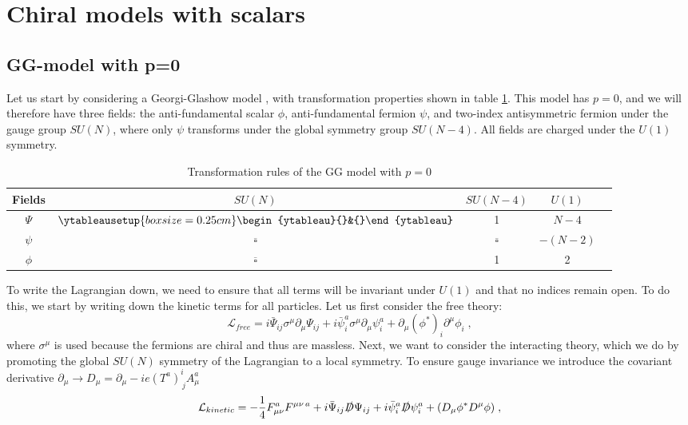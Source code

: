 \section{Chiral models with scalars}
\subsection{GG-model with p=0}
Let us start by considering a Georgi-Glashow model \cite{GGmodel}, with transformation properties shown in table \ref{tab:GGp0}. This model has $p=0$, and we will therefore have three fields: the anti-fundamental scalar $\phi$, anti-fundamental fermion $\psi$, and two-index antisymmetric fermion under the gauge group $SU(N)$, where only $\psi$ transforms under the global symmetry group $SU(N-4)$. All fields are charged under the $U(1)$ symmetry.  
\begin{table}[h] 
    \centering 
    \begin{tabular}{|c|c|c|c|c|} \hline Fields & $SU(N)$ & $SU(N-4)$  & $U(1)$ \\ \hline $\Psi$ & $\ytableausetup{boxsize=0.25cm}\begin{ytableau}{}&{}\end{ytableau}$ & 1 & $N-4$ \\ $\psi$ & $\overline\square$ & $\overline\square$ & $-(N-2)$ \\ \hline $\phi$ & $\overline\square$ & 1  & 2 \\ \hline 
    \end{tabular} 
    \caption{Transformation rules of the GG model with $p=0$} 
    \label{tab:GGp0} 
\end{table}
To write the Lagrangian down, we need to ensure that all terms will be invariant under $U(1)$ and that no indices remain open. To do this, we start by writing down the kinetic terms for all particles. Let us first consider the free theory:
\begin{equation}
    \mathcal{L}_{free}= i \bar \Psi_{ij}\sigma^\mu \partial_\mu\Psi_{ij}+i \bar \psi_i^a\sigma^\mu \partial_\mu\psi_i^a+\partial_\mu (\phi^*)_i\partial^\mu\phi_i\;,
\end{equation}
where $\sigma^\mu$ is used because the fermions are chiral and thus are massless. Next, we want to consider the interacting theory, which we do by promoting the global $SU(N)$ symmetry of the Lagrangian to a local symmetry. To ensure gauge invariance we introduce the covariant derivative $\partial_\mu \to D_\mu= \partial_\mu - ie(T^a)^i_{\,j}A_\mu^a$
\begin{equation}
    \mathcal{L}_{kinetic}= -\frac{1}{4} F_{\mu\nu}^a F^{\mu\nu\,a}+i \bar \Psi_{ij}\slashed{D}\Psi_{ij}+i \bar \psi_i^a\slashed{D}\psi_i^a+(D_\mu \phi^*D^\mu\phi)\;,
\end{equation}
